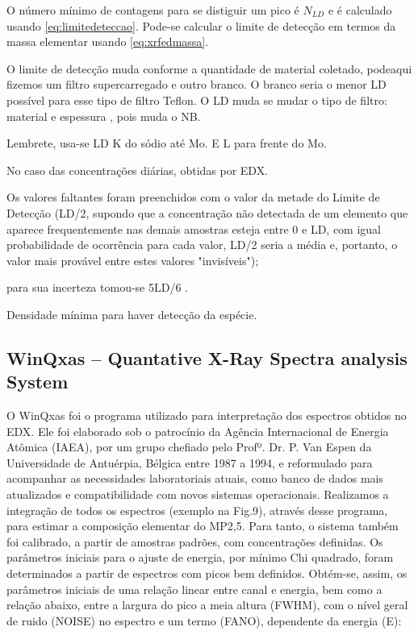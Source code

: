 O número mínimo de contagens para se distiguir um pico é $N_{LD}$ e é
calculado usando \ref{eq:limitedeteccao}.
Pode-se calcular o limite de detecção em termos da massa 
elementar usando \ref{eq:xrfedmassa}. 

O limite de detecção muda conforme a quantidade de material coletado, podeaqui fizemos um filtro supercarregado
e outro branco. O branco seria o menor LD possível para esse tipo de filtro Teflon. 
O LD muda se mudar o tipo de filtro: material e espessura , pois muda o NB. 

Lembrete, usa-se LD K do sódio até Mo. E L para frente do Mo.  
  

No caso das concentrações diárias, obtidas por EDX.  

Os valores faltantes foram preenchidos com o valor da metade do Limite de Detecção 
(LD/2, supondo que a concentração não detectada de um elemento que aparece 
frequentemente nas demais amostras esteja entre 0 e LD, com igual 
probabilidade de ocorrência para cada valor, LD/2 seria a média e, portanto, 
o valor mais provável entre estes valores "invisíveis"); 

para sua incerteza tomou-se 5LD/6 \citep{polissar1998}.


Densidade mínima para haver detecção da espécie. %




\subsection{WinQxas – Quantative X-Ray Spectra analysis System}

O WinQxas foi o programa utilizado para interpretação dos espectros obtidos no EDX. Ele foi elaborado sob o patrocínio da Agência Internacional de Energia Atômica (IAEA), por um grupo chefiado pelo Profº. Dr. P. Van Espen da Universidade de Antuérpia, Bélgica entre 1987 a 1994, e reformulado para acompanhar as necessidades laboratoriais atuais, como banco de dados mais atualizados e compatibilidade com novos sistemas operacionais. 
Realizamos a integração de todos os espectros (exemplo na Fig.9), através desse programa, para estimar a composição elementar do MP2,5. Para tanto, o sistema também foi  calibrado, a partir de amostras padrões, com concentrações definidas. Os parâmetros iniciais para o ajuste de energia, por mínimo Chi quadrado, foram determinados  a partir de espectros com picos bem definidos. Obtém-se, assim, os parâmetros iniciais de uma relação linear entre canal e energia, bem como a relação abaixo, entre a largura do pico a meia altura (FWHM), com o nível geral de ruido (NOISE)  no espectro e um termo (FANO), dependente da energia (E):


